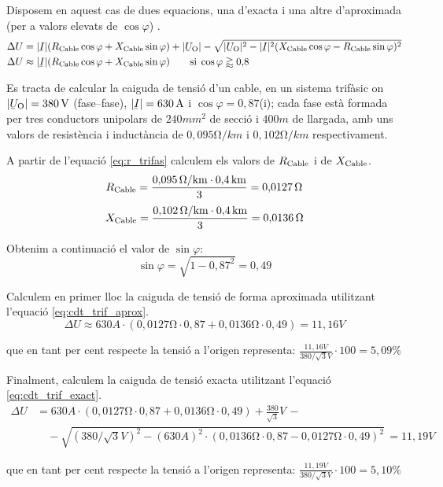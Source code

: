 Disposem en aquest cas de dues equacions, una d'exacta i una altre d'aproximada (per a valors elevats de $\cos \varphi$) .
\begin{subequations}
\begin{align}
   \Delta U &= |\cmplx{I}| ( R\ped{Cable} \cos \varphi + X\ped{Cable} \sin \varphi) + |\cmplx{U}\ped{O}| - \sqrt{|\cmplx{U}\ped{O}|^2 - |\cmplx{I}|^2 ( X\ped{Cable} \cos \varphi - R\ped{Cable} \sin \varphi )^2} \label{eq:cdt_trif_exact} \\
   \Delta U &\approx |\cmplx{I}| ( R\ped{Cable} \cos \varphi + X\ped{Cable} \sin \varphi) \qquad \text{si} \; \cos \varphi \gtrapprox 0{,}8 \label{eq:cdt_trif_aprox}
\end{align}
\end{subequations}

\begin{exemple}
   Es tracta de calcular la caiguda de tensi\'{o} d'un cable, en un sistema trif\`{a}sic on $|\cmplx{U}\ped{O}| = 380\unit{V}$ (fase--fase), $|\cmplx{I}|=630\unit{A}$ i $\cos \varphi = 0{,}87$(i); cada fase est\`{a} formada per tres conductors unipolars de $240\unit{mm^2}$ de secci\'{o} i $400\unit{m}$ de llargada, amb uns valors de resist\`{e}ncia i induct\`{a}ncia de $0{,}095\unit{\ohm/km}$ i $0{,}102\unit{\ohm/km}$ respectivament.

A partir de l'equaci\'{o} \eqref{eq:r_trifas} calculem els valors de $R_\mathrm{Cable}$ i de $X_\mathrm{Cable}$.
\[
   R_\mathrm{Cable} = \frac{0{,}095\mathrm{\,\mathrm{\Omega}/km}\cdot 0{,}4\mathrm{\,km}}{3} = 0{,}0127\mathrm{\,\mathrm{\Omega}}
\]
\[
   X_\mathrm{Cable} = \frac{0{,}102\mathrm{\,\mathrm{\Omega}/km}\cdot 0{,}4\mathrm{\,km}}{3} = 0{,}0136\mathrm{\,\mathrm{\Omega}}
\]

Obtenim a continuaci\'{o} el valor de $\sin \varphi$:
\[
   \sin \varphi = \sqrt{1-0{,}87^2} = 0,49
\]

Calculem en primer lloc la caiguda de tensi\'{o} de forma aproximada utilitzant l'equaci\'{o} \eqref{eq:cdt_trif_aprox}.
\[
   \Delta U \approx 630\unit{A} \cdot ( 0{,}0127\unit{\ohm} \cdot 0{,}87 + 0{,}0136\unit{\ohm} \cdot 0{,}49 ) = 11{,}16\unit{V}
\]

que en tant per cent respecte la tensi\'{o} a l'origen representa:
$\frac{11{,}16\unit{V}}{380/\sqrt{3}\unit{V}} \cdot 100 = 5{,}09\unit{\%} $

Finalment, calculem la caiguda de tensi\'{o} exacta utilitzant l'equaci\'{o} \eqref{eq:cdt_trif_exact}.
\[ \begin{split}
   \Delta U &=  630\unit{A} \cdot ( 0{,}0127\unit{\ohm} \cdot 0{,}87 + 0{,}0136\unit{\ohm} \cdot 0{,}49 ) + \frac{380}{\sqrt{3}}\unit{V} \,- \\
    & \quad - \sqrt{(380/\sqrt{3}\unit{V})^2 - (630\unit{A})^2 \cdot ( 0{,}0136\unit{\ohm} \cdot 0{,}87 - 0{,}0127\unit{\ohm} \cdot 0{,}49 )^2 } \,= 11{,}19\unit{V}
\end{split} \]

que en tant per cent respecte la tensi\'{o} a l'origen representa:
$\frac{11{,}19\unit{V}}{380/\sqrt{3}\unit{V}} \cdot 100 = 5{,}10\unit{\%} $
\end{exemple}

